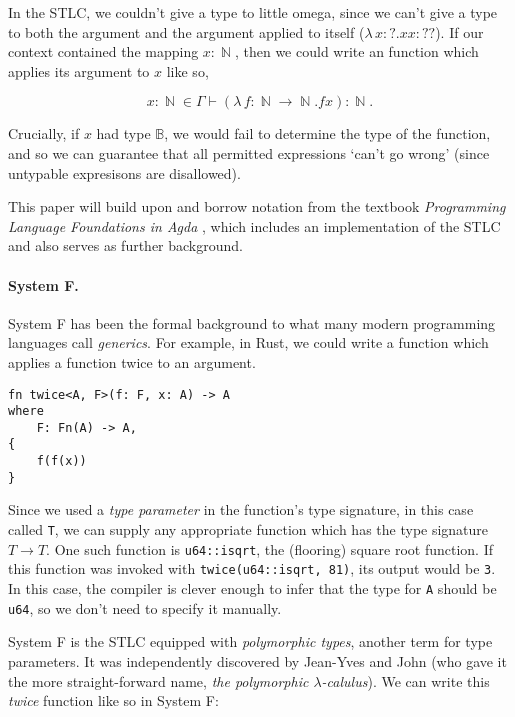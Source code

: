 \documentclass[logo,bsc,singlespacing,parskip,online]{infthesis}
\DeclareMathOperator{\nat}{\mathbb{N}}
\begin{document}
In the STLC, we couldn't give a type to little omega, since we can't give a type
to both the argument and the argument applied to itself ($\lambda \, x  \colon ?
. x x \colon ??$). If our context contained the mapping $x \colon \nat$, then we
could write an function which applies its argument to $x$ like so,

\begin{equation*}
  x \colon \nat \in \Gamma \vdash (\lambda \, f \colon \nat \to \nat . f x) \colon \nat.
\end{equation*}

Crucially, if $x$ had type $\mathbb{B}$, we would fail to determine the type of
the function, and so we can guarantee that all permitted expressions `can't go
wrong' \citep{milner_theory_1978} (since untypable expresisons are disallowed).

This paper will build upon and borrow notation from the textbook
\textit{Programming Language Foundations in Agda}
\citep{wadler_programming_2022}, which includes an implementation of the STLC
and also serves as further background.

\paragraph*{System F.} System F has been the formal background to what many modern programming
languages call \textit{generics}. For example, in Rust, we could write a function which applies a
function twice to an argument.

\begin{verbatim}
fn twice<A, F>(f: F, x: A) -> A
where
    F: Fn(A) -> A,
{
    f(f(x))
}
\end{verbatim}

Since we used a \textit{type parameter} in the function's type signature, in this case called
\texttt{T}, we can supply any appropriate function which has the type signature $T \to T$. One such
function is \texttt{u64::isqrt}, the (flooring) square root function. If this function was invoked
with \texttt{twice(u64::isqrt, 81)}, its output would be \texttt{3}. In this case, the compiler is
clever enough to infer that the type for \texttt{A} should be \texttt{u64}, so we don't need to
specify it manually.

System F is the STLC equipped with \textit{polymorphic types}, another term for type parameters. It
was independently discovered by Jean-Yves  and John (who gave it the more straight-forward name,
\textit{the polymorphic
$\lambda$-calulus}). We can write this \textit{twice} function like so in System F:
\end{document}
